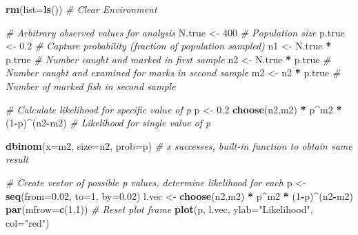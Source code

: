 \documentclass[
]{krantz}
\makeatletter
\newenvironment{Shaded}{\begin{snugshade}}{\end{snugshade}}
\newcommand{\AttributeTok}[1]{\textcolor[rgb]{0.27,0.27,0.27}{#1}}
\newcommand{\CommentTok}[1]{\textcolor[rgb]{0.37,0.37,0.37}{\textit{#1}}}
\newcommand{\DecValTok}[1]{\textcolor[rgb]{0.06,0.06,0.06}{#1}}
\newcommand{\FloatTok}[1]{\textcolor[rgb]{0.06,0.06,0.06}{#1}}
\newcommand{\FunctionTok}[1]{\textcolor[rgb]{0.27,0.27,0.27}{\textbf{#1}}}
\newcommand{\NormalTok}[1]{#1}
\newcommand{\OtherTok}[1]{\textcolor[rgb]{0.37,0.37,0.37}{#1}}
\newcommand{\SpecialCharTok}[1]{\textcolor[rgb]{0.43,0.43,0.43}{\textbf{#1}}}
\newcommand{\StringTok}[1]{\textcolor[rgb]{0.5,0.5,0.5}{#1}}
\newenvironment{kframe}{%
\medskip{}
\setlength{\fboxsep}{.8em}
 \def\at@end@of@kframe{}%
 \ifinner\ifhmode%
  \def\at@end@of@kframe{\end{minipage}}%
  \begin{minipage}{\columnwidth}%
 \fi\fi%
 \def\FrameCommand##1{\hskip\@totalleftmargin \hskip-\fboxsep
 \colorbox{shadecolor}{##1}\hskip-\fboxsep
     \hskip-\linewidth \hskip-\@totalleftmargin \hskip\columnwidth}%
 \MakeFramed {\advance\hsize-\width
   \@totalleftmargin\z@ \linewidth\hsize
   \@setminipage}}%
 {\par\unskip\endMakeFramed%
 \at@end@of@kframe}
\renewenvironment{Shaded}{\begin{kframe}}{\end{kframe}}
\makeatother
\begin{document}
\begin{Shaded}
\begin{Highlighting}[]
\FunctionTok{rm}\NormalTok{(}\AttributeTok{list=}\FunctionTok{ls}\NormalTok{()) }\CommentTok{\# Clear Environment}

\CommentTok{\# Arbitrary \textquotesingle{}observed\textquotesingle{} values for analysis}
\NormalTok{N.true }\OtherTok{\textless{}{-}} \DecValTok{400}  \CommentTok{\# Population size}
\NormalTok{p.true }\OtherTok{\textless{}{-}} \FloatTok{0.2} \CommentTok{\# Capture probability (fraction of population sampled)}
\NormalTok{n1 }\OtherTok{\textless{}{-}}\NormalTok{ N.true }\SpecialCharTok{*}\NormalTok{ p.true }\CommentTok{\# Number caught and marked in first sample}
\NormalTok{n2 }\OtherTok{\textless{}{-}}\NormalTok{ N.true }\SpecialCharTok{*}\NormalTok{ p.true }\CommentTok{\# Number caught and examined for marks in second sample}
\NormalTok{m2 }\OtherTok{\textless{}{-}}\NormalTok{ n2 }\SpecialCharTok{*}\NormalTok{ p.true }\CommentTok{\# Number of marked fish in second sample}

\CommentTok{\# Calculate likelihood for specific value of p}
\NormalTok{p }\OtherTok{\textless{}{-}} \FloatTok{0.2}
\FunctionTok{choose}\NormalTok{(n2,m2) }\SpecialCharTok{*}\NormalTok{ p}\SpecialCharTok{\^{}}\NormalTok{m2 }\SpecialCharTok{*}\NormalTok{ (}\DecValTok{1}\SpecialCharTok{{-}}\NormalTok{p)}\SpecialCharTok{\^{}}\NormalTok{(n2}\SpecialCharTok{{-}}\NormalTok{m2) }\CommentTok{\# Likelihood for single value of p}

\FunctionTok{dbinom}\NormalTok{(}\AttributeTok{x=}\NormalTok{m2, }\AttributeTok{size=}\NormalTok{n2, }\AttributeTok{prob=}\NormalTok{p) }\CommentTok{\# x successes, built{-}in function to obtain same result}

\CommentTok{\# Create vector of possible p values, determine likelihood for each}
\NormalTok{p }\OtherTok{\textless{}{-}} \FunctionTok{seq}\NormalTok{(}\AttributeTok{from=}\FloatTok{0.02}\NormalTok{, }\AttributeTok{to=}\DecValTok{1}\NormalTok{, }\AttributeTok{by=}\FloatTok{0.02}\NormalTok{)}
\NormalTok{l.vec }\OtherTok{\textless{}{-}} \FunctionTok{choose}\NormalTok{(n2,m2) }\SpecialCharTok{*}\NormalTok{ p}\SpecialCharTok{\^{}}\NormalTok{m2 }\SpecialCharTok{*}\NormalTok{ (}\DecValTok{1}\SpecialCharTok{{-}}\NormalTok{p)}\SpecialCharTok{\^{}}\NormalTok{(n2}\SpecialCharTok{{-}}\NormalTok{m2)}
\FunctionTok{par}\NormalTok{(}\AttributeTok{mfrow=}\FunctionTok{c}\NormalTok{(}\DecValTok{1}\NormalTok{,}\DecValTok{1}\NormalTok{)) }\CommentTok{\# Reset plot frame}
\FunctionTok{plot}\NormalTok{(p, l.vec, }\AttributeTok{ylab=}\StringTok{"Likelihood"}\NormalTok{, }\AttributeTok{col=}\StringTok{"red"}\NormalTok{)}


\end{Highlighting}
\end{Shaded}
\end{document}
